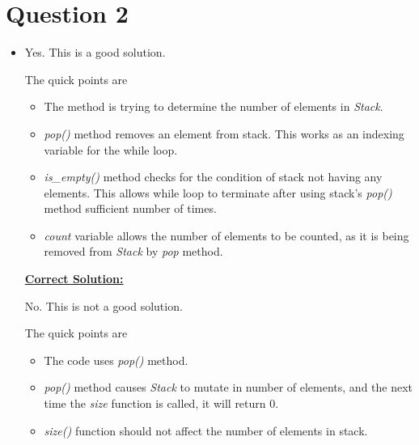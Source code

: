 \documentclass[12pt]{article}
\begin{document}
\section*{Question 2}
\begin{itemize}
    \item

    Yes. This is a good solution.

    \bigskip

    The quick points are

    \begin{itemize}
        \item The method is trying to determine the number of elements in \textit{Stack}.
        \item \textit{pop()} method removes an element from stack. This works as an indexing variable for the while loop.
        \item \textit{is\_empty()} method checks for the condition of stack not having any elements.
        This allows while loop to terminate after using stack's \textit{pop()} method sufficient number of times.
        \item \textit{count} variable allows the number of elements to be counted, as it is being
        removed from \textit{Stack} by \textit{pop} method.
    \end{itemize}

    \bigskip

    \begin{mdframed}
        \underline{\textbf{Correct Solution:}}

        \bigskip
        \color{red}
        No. This is not a good solution.
        \color{black}

        \bigskip

        The quick points are

        \color{red}
        \begin{itemize}
            \item The code uses \textit{pop()} method.
            \item \textit{pop()} method causes \textit{Stack} to mutate in
            number of elements, and the next time the \textit{size} function is called,
            it will return 0.
            \item \textit{size()} function should not affect the number of elements in stack.
        \end{itemize}
        \color{black}
    \end{mdframed}
\end{itemize}
\end{document}

